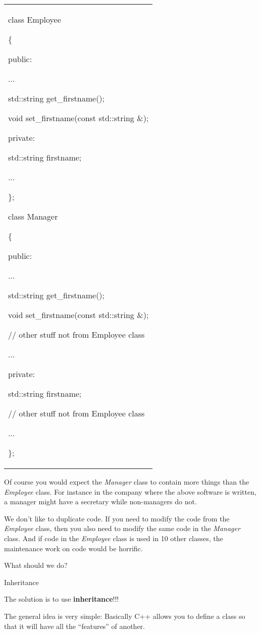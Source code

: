 \documentclass[
]{article}
\begin{document}
\begin{longtable}[]{@{}
  >{\raggedright\arraybackslash}p{}@{}}
\toprule\noalign{}
 \\
\midrule\noalign{}
\endhead
\bottomrule\noalign{}
\endlastfoot
class Employee

\{

public:

...

std::string get\_firstname();

void set\_firstname(const std::string \&);

private:

std::string firstname;

...

\};

class Manager

\{

public:

...

std::string get\_firstname();

void set\_firstname(const std::string \&);

// other stuff not from Employee class

...

private:

std::string firstname;

// other stuff not from Employee class

...

\}; \\
\end{longtable}

Of course you would expect the \emph{Manager} class to contain more
things than the \emph{Employee} class. For instance in the company where
the above software is written, a manager might have a secretary while
non-managers do not.

We don't like to duplicate code. If you need to modify the code from the
\emph{Employee} class, then you also need to modify the same code in the
\emph{Manager} class. And if code in the \emph{Employee} class is used
in 10 other classes, the maintenance work on code would be horrific.

What should we do?

Inheritance

The solution is to use \textbf{inheritance}!!!

The general idea is very simple: Basically C++ allows you to define a
class so that it will have all the ``features'' of another.
\end{document}
